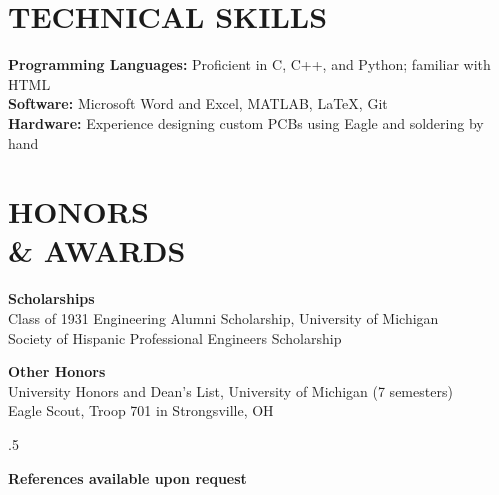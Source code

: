 \documentclass[margin,11pt]{res}
\begin{document}
\begin{resume}
\vspace{-10pt}
\section{TECHNICAL SKILLS}
\textbf{Programming Languages:}
Proficient in C, C++, and Python; familiar with HTML\\
\textbf{Software:}
Microsoft Word and Excel, MATLAB, LaTeX, Git\\
\textbf{Hardware:}
Experience designing custom PCBs using Eagle and soldering by hand

\vspace{-10pt}
\section{HONORS\\ \& AWARDS}
\textbf{Scholarships}\\
Class of 1931 Engineering Alumni Scholarship, University of Michigan\\
Society of Hispanic Professional Engineers Scholarship

\textbf{Other Honors}\\
University Honors and Dean's List, University of Michigan (7 semesters)\\
Eagle Scout, Troop 701 in Strongsville, OH

\vspace{10pt}
\moveleft.5\hoffset\centerline{\large\bf References available upon request}


\end{resume}
\end{document}
